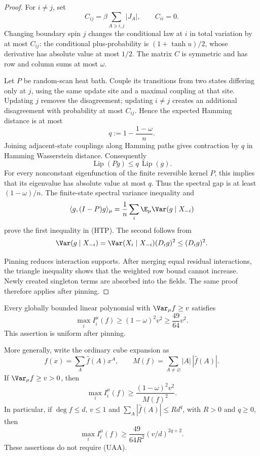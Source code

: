 \begin{proof}
For \(i\ne j\), set
\[
 C_{ij}=\beta\sum_{A\ni i,j}|J_A|,\qquad C_{ii}=0.
\]
Changing boundary spin \(j\) changes the conditional law at \(i\)
in total variation by at most \(C_{ij}\): the conditional
plus-probability is \((1+\tanh u)/2\), whose derivative has absolute
value at most \(1/2\). The matrix \(C\) is symmetric and has row and
column sums at most \(\omega\).

Let \(P\) be random-scan heat bath. Couple its transitions from two
states differing only at \(j\), using the same update site and a
maximal coupling at that site. Updating \(j\) removes the disagreement;
updating \(i\ne j\) creates an additional disagreement with probability
at most \(C_{ij}\). Hence the expected Hamming distance is at most
\[
 q:=1-\frac{1-\omega}{n}.
\]
Joining adjacent-state couplings along Hamming paths gives contraction
by \(q\) in Hamming Wasserstein distance. Consequently
\[
 \operatorname{Lip}(Pg)\le q\,\operatorname{Lip}(g).
\]
For every nonconstant eigenfunction of the finite reversible kernel
\(P\), this implies that its eigenvalue has absolute value at most
\(q\). Thus the spectral gap is at least \((1-\omega)/n\).
The finite-state spectral variance inequality and
\[
 \langle g,(I-P)g\rangle_\mu
 =\frac1n\sum_i\E_\mu\Var(g\mid X_{-i})
\]
prove the first inequality in (HTP). The second follows from
\[
 \Var(g\mid X_{-i})
 =\Var(X_i\mid X_{-i})(D_ig)^2\le(D_ig)^2.
\]

Pinning reduces interaction supports. After merging equal residual
interactions, the triangle inequality shows that the weighted row
bound cannot increase. Newly created singleton terms are absorbed
into the fields. The same proof therefore applies after pinning.
\end{proof}

\begin{proposition}
\label{ian:weighted-linear-aa}
Every globally bounded linear polynomial with
\(\Var_\mu f\ge v\) satisfies
\[
 \max_iI_i^\mu(f)\ge(1-\omega)^2v^2
 \ge\frac{49}{64}v^2.
\]
This assertion is uniform after pinning.

More generally, write the ordinary cube expansion as
\[
 f(x)=\sum_A\widehat f(A)x^A,\qquad
 M(f)=\sum_{A\ne\varnothing}|A|\,|\widehat f(A)|.
\]
If \(\Var_\mu f\ge v>0\), then
\[
 \max_iI_i^\mu(f)
 \ge\frac{(1-\omega)^2v^2}{M(f)^2}.
 \tag{HTC}
\]
In particular, if \(\deg f\le d\), \(v\le1\) and
\(\sum_A|\widehat f(A)|\le Rd^q\), with \(R>0\) and \(q\ge0\), then
\[
 \max_iI_i^\mu(f)
 \ge\frac{49}{64R^2}(v/d)^{2q+2}.
\]
These assertions do not require (UAA).
\end{proposition}


